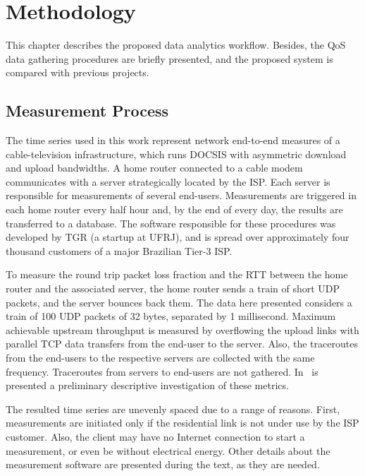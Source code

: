 \chapter{Methodology}
\label{chap:methodology}

This chapter describes the proposed data analytics workflow.
Besides, the QoS data gathering procedures are briefly presented,
and the proposed system is compared with previous projects.

\section{Measurement Process}

The time series used in this work represent network end-to-end measures of a
cable-television infrastructure, which runs DOCSIS with asymmetric download and
upload bandwidths. A home router connected to a cable modem communicates
with a server strategically located by the ISP\@. Each server is responsible
for measurements of several end-users.
Measurements are triggered in
each home router every half hour and, by the end of every day,
the results are transferred to a database.
The software responsible for these procedures was
developed by TGR (a startup at UFRJ),
and is spread over approximately four thousand customers of a major Brazilian
Tier-3 ISP\@.

To measure the round
trip packet loss fraction and the RTT between the home router and the associated
server, the
home router sends a train of short UDP packets, and the server bounces back
them. The data here presented considers a train of 100 UDP packets of 32 bytes,
separated by 1 millisecond.
Maximum achievable upstream throughput is measured by overflowing the upload
links with parallel TCP data transfers from the end-user to the
server.
Also, the traceroutes from the end-users
to the respective servers are collected with the same frequency. Traceroutes
from servers to end-users are not gathered.
In~\cite{a_preliminary_performance_measurement_study_of_residential_broadband_services_in_brazil}
is presented a preliminary descriptive investigation of these metrics.

The resulted time series are unevenly spaced due to a range of reasons. First,
measurements are initiated only if the residential link is not under use by the
ISP customer. Also, the client may have no Internet connection to start a
measurement, or even be without electrical energy. Other details about the
measurement software are presented during the text, as they are needed.

